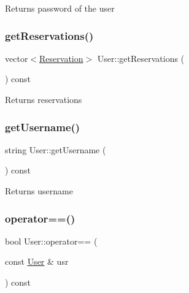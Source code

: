 \begin{DoxyReturn}{Returns}
password of the user 
\end{DoxyReturn}
\hypertarget{class_user_ab7b3c2424a2828feb264967c3c13d2cb}{}\label{class_user_ab7b3c2424a2828feb264967c3c13d2cb} 
\subsubsection{\texorpdfstring{get\+Reservations()}{getReservations()}}
{\footnotesize\ttfamily vector$<$\hyperlink{class_reservation}{Reservation}$>$ User\+::get\+Reservations (\begin{DoxyParamCaption}{ }\end{DoxyParamCaption}) const\hspace{0.3cm}{\ttfamily [inline]}}

\begin{DoxyReturn}{Returns}
reservations 
\end{DoxyReturn}
\hypertarget{class_user_a82e034043e04b2d750c654c8b2f2ce78}{}\label{class_user_a82e034043e04b2d750c654c8b2f2ce78} 
\subsubsection{\texorpdfstring{get\+Username()}{getUsername()}}
{\footnotesize\ttfamily string User\+::get\+Username (\begin{DoxyParamCaption}{ }\end{DoxyParamCaption}) const\hspace{0.3cm}{\ttfamily [inline]}}

\begin{DoxyReturn}{Returns}
username 
\end{DoxyReturn}
\hypertarget{class_user_a0881b78e5e9e5040c1f5ecc0e16746b8}{}\label{class_user_a0881b78e5e9e5040c1f5ecc0e16746b8} 
\subsubsection{\texorpdfstring{operator==()}{operator==()}}
{\footnotesize\ttfamily bool User\+::operator== (\begin{DoxyParamCaption}\item[{const \hyperlink{class_user}{User} \&}]{usr }\end{DoxyParamCaption}) const}



